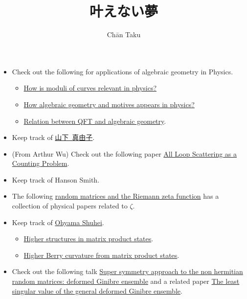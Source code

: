 \documentclass{article}
\title{叶えない夢}
\author{Ch\=an Taku}
\begin{document}
\maketitle

\begin{itemize}
    \item Check out the following for applications of algebraic geometry in Physics.
    \begin{itemize}
        \item \href{https://math.stackexchange.com/questions/2099/how-is-moduli-of-curves-relevant-in-physics}{How is moduli of curves relevant in physics?}
        \item \href{https://physics.stackexchange.com/questions/83687/how-algebraic-geometry-and-motives-appears-in-physics}{How algebraic geometry and motives appears in physics?}
        \item \href{https://physics.stackexchange.com/questions/295878/relation-between-qft-and-algebraic-geometry}{Relation between QFT and algebraic geometry}.
    \end{itemize}
    \item Keep track of \href{https://en.m.wikipedia.org/wiki/Mayuko_Yamashita}{山下\ 真由子}.
    \item (From Arthur Wu) Check out the following paper \href{https://inspirehep.net/literature/2703921}{All Loop Scattering as a Counting Problem}.
    \item Keep track of Hanson Smith.
    \item The following \href{https://empslocal.ex.ac.uk/people/staff/mrwatkin/zeta/random.htm}{random matrices and the Riemann zeta function} has a collection of physical papers related to $\zeta$.
    \item Keep track of \href{https://arxiv.org/search/cond-mat?searchtype=author&query=Ohyama,+S}{Ohyama Shuhei}.
    \begin{itemize}
        \item \href{https://arxiv.org/pdf/2304.05356.pdf}{Higher structures in matrix product states}.
        \item \href{https://arxiv.org/pdf/2305.08109.pdf}{Higher Berry curvature from matrix product states}.
    \end{itemize}
    \item Check out the following talk \href{https://www.math.princeton.edu/events/super-symmetry-approach-non-hermitian-random-matrices-deformed-ginibre-ensemble-2023-10}{Super symmetry approach to the non hermitian random matrices: deformed Ginibre ensemble} and a related paper \href{https://arxiv.org/pdf/2204.06026.pdf}{The least singular value of the general deformed Ginibre ensemble}.

\end{itemize}
\end{document}
